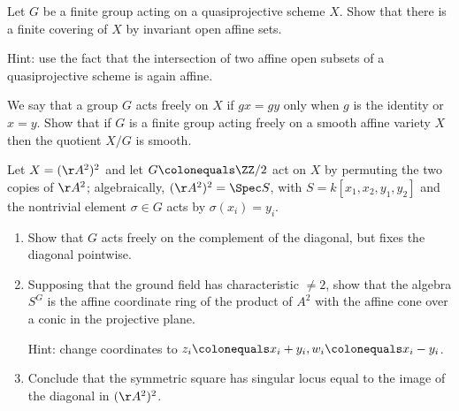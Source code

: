 \begin{exercise}\label{quotient of projective}
 Let $G$ be a 
finite group acting
%
on a 
quasiprojective scheme
%
$X$. 
Show that there is a finite covering of $X$ by invariant open affine sets.
 
 Hint: use the fact that the intersection of two affine open subsets of a quasiprojective scheme is again affine.
  \end{exercise}


\begin{exercise}\label{free actions}
We say that a group $G$ acts freely on $X$ if $gx = gy$ only when $g$ is the identity or $x=y$. Show that
 if $G$ is a finite 
group acting freely
%
on a smooth affine variety $X$ then the 
quotient
% 
$X/G$ is smooth.
\end{exercise}


\begin{exercise}
 \label{sym2A2} 
 Let $X = (\AA^{2})^{2}$ and let $G \colonequals \ZZ/2$ act on $X$ by permuting the two copies of  $\AA^{2}$; algebraically,
$(\AA^{2})^{2} = \Spec S$, with $S = k[x_{1},x_{2}, y_{1}, y_{2}]$ and the nontrivial element $\sigma\in G$ acts by
$\sigma(x_{i}) = y_{i}$. 
 \begin{enumerate}
\item Show that $G$ acts freely on the complement of the diagonal, but fixes the diagonal pointwise.
\item Supposing that the ground field has characteristic $\neq 2$,
show that the algebra $S^{G}$ is the affine 
coordinate ring
%
of the product
of $A^2$ with the affine cone over a conic in the projective plane. 

Hint: change coordinates to $z_i \colonequals x_i+y_i, w_i \colonequals x_i - y_i$.
\item Conclude that the 
symmetric square
%
has singular locus equal to the image of the diagonal in 
$(\AA^{2})^{2}$.
\end{enumerate}
\end{exercise}

